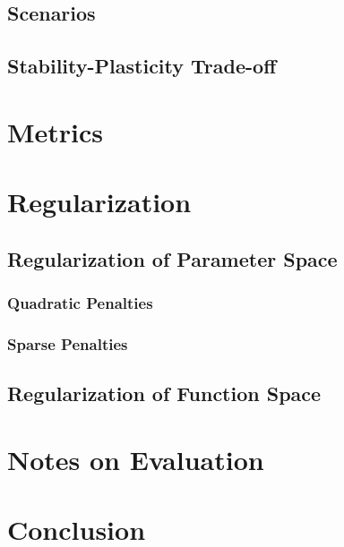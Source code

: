 \documentclass[12pt]{article}
\begin{document}
	\subsection{Scenarios}
	\label{scenarios}
	
	\subsection{Stability-Plasticity Trade-off}
	\label{cf}
	
	\section{Metrics}
	\label{metrics}
	
	\section{Regularization}
	\label{reg0}
	
	\subsection{Regularization of Parameter Space}
	\label{reg01}
	\subsubsection{Quadratic Penalties}
	\label{reg011}
	
	\subsubsection{Sparse Penalties}
	\label{reg012}
	
	\subsection{Regularization of Function Space}
	\label{reg02}
	
	\section{Notes on Evaluation}
	\label{eval}
	
	\section{Conclusion}
	\label{conclusion}
	
	
	\newpage
	
	
\end{document}
